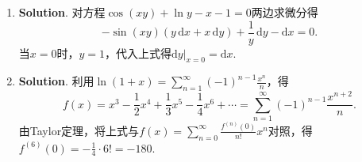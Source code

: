 \documentclass[../main.tex]{subfiles}
\begin{document}
\begin{enumerate}
          当$x\neq0$时，$\ln f(x)=\frac{\ln(1+x^{2})}{\sin x}$，所以
          \[
              \begin{aligned}
                  f'(x)= {} & f(x)\cdot\left(\frac{\frac{2x}{1+x^2}\sin x-\ln(1+x^2)\cos x}{\sin^2 x}\right)                            \\
                  = {}      & (1+x^{2})^{\frac{1}{\sin x}}\cdot\left(\frac{\frac{2x}{1+x^2}\sin x-\ln(1+x^2)\cos x}{\sin^2 x}\right)    \\
                  = {}      & (1+x^{2})^{\frac{1}{\sin x}}\cdot\left(\frac{2x}{(1+x^2)\sin x}-\frac{\ln(1+x^2)\cos x}{\sin^2 x}\right).
              \end{aligned}
          \]
          当$x=0$时，
          \[
              \begin{aligned}
                  f'(0)= {} & \lim_{x\to0}\frac{(1+x^2)^{\frac{1}{\sin x}}-1}{x}=\lim_{x\to0}\frac{\mathrm{e}^{\frac{\ln(1+x^2)}{\sin x}}-1}{x} \\
                  = {}      & \lim_{x\to 0}\frac{\ln(1+x^2)}{x\sin x}=1.
              \end{aligned}
          \]
          综上所述，$f'(x)=
              \begin{cases}
                  (1+x^{2})^{\frac{1}{\sin x}}\cdot\left(\frac{2x}{(1+x^2)\sin x}-\frac{\ln(1+x^2)\cos x}{\sin^2 x}\right), & x\neq0, \\
                  1,                                                                                                        & x=0.
              \end{cases}$

    \item \textbf{Solution}. 对方程$\cos(xy)+\ln y - x - 1=0$两边求微分得
          \[
              -\sin(xy)(y\,\mathrm{d}x+x\,\mathrm{d}y)+\frac{1}{y}\,\mathrm{d}y-\mathrm{d}x=0
              .
          \]
          当$x=0$时，$y=1$，代入上式得$\left.\mathrm{d}y\right|_{x=0}=\mathrm{d}x$.

    \item \textbf{Solution}. 利用$\ln(1+x)=\sum_{n=1}^{\infty}(-1)^{n-1}\frac{x^{n}}{n}$，得
          \[
              f(x)=x^{3}-\frac{1}{2}x^{4}+\frac{1}{3}x^{5}-\frac{1}{4}x^{6}+\cdots=\sum
              _{n=1}^{\infty}(-1)^{n-1}\frac{x^{n+2}}{n}.
          \]
          由Taylor定理，将上式与$f(x)=\sum_{n=0}^{\infty}\frac{f^{(n)}(0)}{n!}x^{n}$对照，得$f
                  ^{(6)}(0)=-\frac{1}{4}\cdot 6!=-180.$
\end{enumerate}
\end{document}
